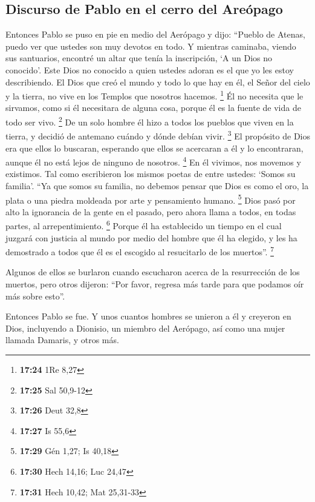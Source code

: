 \hypertarget{discurso-de-pablo-en-el-cerro-del-areuxf3pago}{%
\subsection{Discurso de Pablo en el cerro del
Areópago}\label{discurso-de-pablo-en-el-cerro-del-areuxf3pago}}

 Entonces Pablo se puso en pie en medio del Aerópago y
dijo: ``Pueblo de Atenas, puedo ver que ustedes son muy devotos en todo.
 Y mientras caminaba, viendo sus santuarios, encontré un
altar que tenía la inscripción, `A un Dios no conocido'. Este Dios no
conocido a quien ustedes adoran es el que yo les estoy describiendo.
 El Dios que creó el mundo y todo lo que hay en él, el
Señor del cielo y la tierra, no vive en los Templos que nosotros
hacemos. \footnote{\textbf{17:24} 1Re 8,27}  Él no
necesita que le sirvamos, como si él necesitara de alguna cosa, porque
él es la fuente de vida de todo ser vivo. \footnote{\textbf{17:25} Sal
  50,9-12}  De un solo hombre él hizo a todos los pueblos
que viven en la tierra, y decidió de antemano cuándo y dónde debían
vivir. \footnote{\textbf{17:26} Deut 32,8}  El propósito
de Dios era que ellos lo buscaran, esperando que ellos se acercaran a él
y lo encontraran, aunque él no está lejos de ninguno de nosotros.
\footnote{\textbf{17:27} Is 55,6}  En él vivimos, nos
movemos y existimos. Tal como escribieron los mismos poetas de entre
ustedes: `Somos su familia'.  ``Ya que somos su familia,
no debemos pensar que Dios es como el oro, la plata o una piedra
moldeada por arte y pensamiento humano. \footnote{\textbf{17:29} Gén
  1,27; Is 40,18}  Dios pasó por alto la ignorancia de la
gente en el pasado, pero ahora llama a todos, en todas partes, al
arrepentimiento. \footnote{\textbf{17:30} Hech 14,16; Luc 24,47}
 Porque él ha establecido un tiempo en el cual juzgará
con justicia al mundo por medio del hombre que él ha elegido, y les ha
demostrado a todos que él es el escogido al resucitarlo de los
muertos''. \footnote{\textbf{17:31} Hech 10,42; Mat 25,31-33}

 Algunos de ellos se burlaron cuando escucharon acerca de
la resurrección de los muertos, pero otros dijeron: ``Por favor, regresa
más tarde para que podamos oír más sobre esto''.

 Entonces Pablo se fue.  Y unos cuantos
hombres se unieron a él y creyeron en Dios, incluyendo a Dionisio, un
miembro del Aerópago, así como una mujer llamada Damaris, y otros más.

